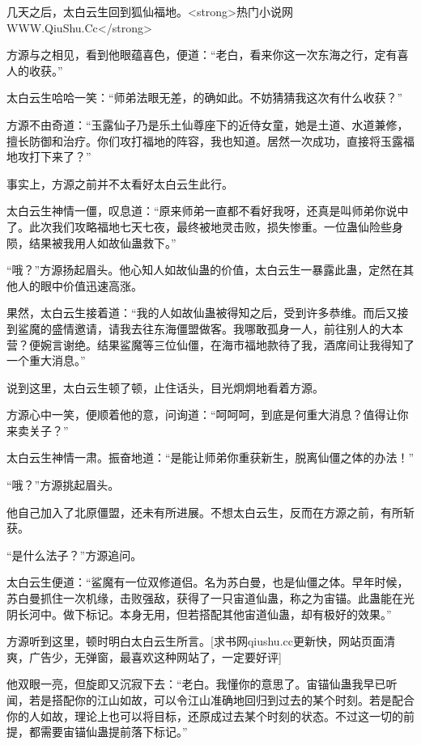 
\begin{this_body}

几天之后，太白云生回到狐仙福地。<strong>热门小说网WWW.QiuShu.Cc</strong>

方源与之相见，看到他眼蕴喜色，便道：“老白，看来你这一次东海之行，定有喜人的收获。”

太白云生哈哈一笑：“师弟法眼无差，的确如此。不妨猜猜我这次有什么收获？”

方源不由奇道：“玉露仙子乃是乐土仙尊座下的近侍女童，她是土道、水道兼修，擅长防御和治疗。你们攻打福地的阵容，我也知道。居然一次成功，直接将玉露福地攻打下来了？”

事实上，方源之前并不太看好太白云生此行。

太白云生神情一僵，叹息道：“原来师弟一直都不看好我呀，还真是叫师弟你说中了。此次我们攻略福地七天七夜，最终被地灵击败，损失惨重。一位蛊仙险些身陨，结果被我用人如故仙蛊救下。”

“哦？”方源扬起眉头。他心知人如故仙蛊的价值，太白云生一暴露此蛊，定然在其他人的眼中价值迅速高涨。

果然，太白云生接着道：“我的人如故仙蛊被得知之后，受到许多恭维。而后又接到鲨魔的盛情邀请，请我去往东海僵盟做客。我哪敢孤身一人，前往别人的大本营？便婉言谢绝。结果鲨魔等三位仙僵，在海市福地款待了我，酒席间让我得知了一个重大消息。”

说到这里，太白云生顿了顿，止住话头，目光炯炯地看着方源。

方源心中一笑，便顺着他的意，问询道：“呵呵呵，到底是何重大消息？值得让你来卖关子？”

太白云生神情一肃。振奋地道：“是能让师弟你重获新生，脱离仙僵之体的办法！”

“哦？”方源挑起眉头。

他自己加入了北原僵盟，还未有所进展。不想太白云生，反而在方源之前，有所斩获。

“是什么法子？”方源追问。

太白云生便道：“鲨魔有一位双修道侣。名为苏白曼，也是仙僵之体。早年时候，苏白曼抓住一次机缘，击败强敌，获得了一只宙道仙蛊，称之为宙锚。此蛊能在光阴长河中。做下标记。本身无用，但若搭配其他宙道仙蛊，却有极好的效果。”

方源听到这里，顿时明白太白云生所言。[求书网qiushu.cc更新快，网站页面清爽，广告少，无弹窗，最喜欢这种网站了，一定要好评]

他双眼一亮，但旋即又沉寂下去：“老白。我懂你的意思了。宙锚仙蛊我早已听闻，若是搭配你的江山如故，可以令江山准确地回归到过去的某个时刻。若是配合你的人如故，理论上也可以将目标，还原成过去某个时刻的状态。不过这一切的前提，都需要宙锚仙蛊提前落下标记。”


\end{this_body}
